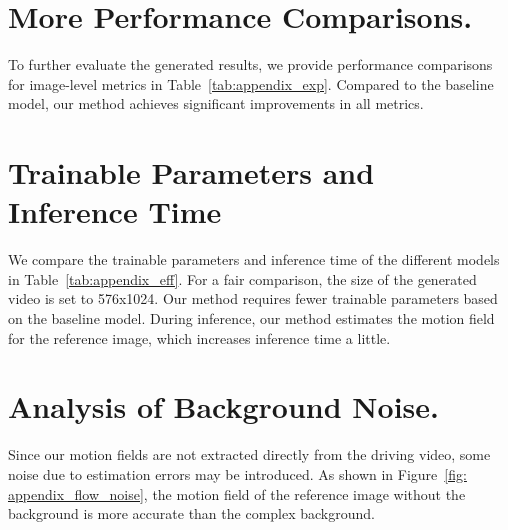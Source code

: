 {
\section{More Performance Comparisons.}
To further evaluate the generated results, we provide performance comparisons for image-level metrics in Table~\ref{tab:appendix_exp}. Compared to the baseline model, our method achieves significant improvements in all metrics.
}
{
\section{Trainable Parameters and Inference Time}
We compare the trainable parameters and inference time of the different models in Table~\ref{tab:appendix_eff}. For a fair comparison, the size of the generated video is set to 576x1024. Our method requires fewer trainable parameters based on the baseline model.
During inference, our method estimates the motion field for the reference image, which increases inference time a little.
}

{
\section{Analysis of Background Noise.}
Since our motion fields are not extracted directly from the driving video, some noise due to estimation errors may be introduced. As shown in Figure~\ref{fig: appendix_flow_noise}, the motion field of the reference image without the background is more accurate than the complex background.
}

